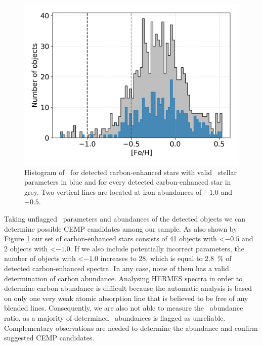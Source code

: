 \begin{figure}
	\centering
	\includegraphics[width=\columnwidth]{Fe_H_cannon.png}
	\caption{Histogram of \Feh\ for detected carbon-enhanced stars with valid \TC\ stellar parameters in blue and for every detected carbon-enhanced star in grey. Two vertical lines are located at iron abundances of $-1.0$ and $-0.5$.}
	\label{fig:feh_candidates}
\end{figure}

Taking unflagged \TC\ parameters and abundances of the detected objects we can determine possible CEMP candidates among our sample. As also shown by Figure \ref{fig:feh_candidates} our set of carbon-enhanced stars consists of 41 objects with \Feh \textless $-0.5$ and 2 objects with \Feh \textless $-1.0$. If we also include potentially incorrect parameters, the number of objects with \Feh \textless $-1.0$ increases to 28, which is equal to $2.8$~\% of detected carbon-enhanced spectra. In any case, none of them has a valid determination of carbon abundance. Analysing HERMES spectra in order to determine carbon abundance is difficult because the automatic analysis is based on only one very weak atomic absorption line that is believed to be free of any blended lines. Consequently, we are also not able to measure the \CO\ abundance ratio, as a majority of determined \Cfe\ abundances is flagged as unreliable. Complementary observations are needed to determine the abundance and confirm suggested CEMP candidates.

